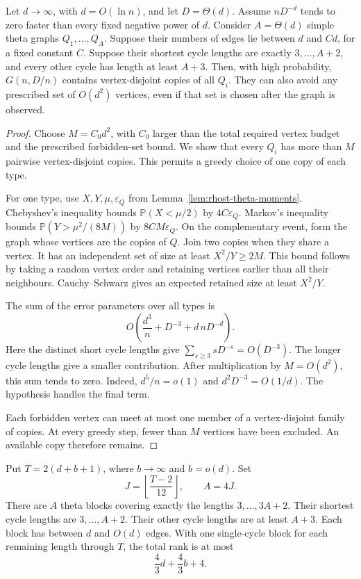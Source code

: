 \begin{lemma}
\label{lem:rhost-theta-list}
Let $d\to\infty$, with $d=O(\ln n)$, and let $D=\Theta(d)$.
Assume $nD^{-d}$ tends to zero faster than every fixed negative power of $d$.
Consider $A=\Theta(d)$ simple theta graphs $Q_1,\ldots,Q_A$.
Suppose their numbers of edges lie between $d$ and $Cd$, for a fixed constant $C$.
Suppose their shortest cycle lengths are exactly $3,\ldots,A+2$,
and every other cycle has length at least $A+3$.
Then, with high probability, $G(n,D/n)$ contains vertex-disjoint copies of all $Q_i$.
They can also avoid any prescribed set of $O(d^2)$ vertices, even if that set is chosen after the graph is observed.
\end{lemma}

\begin{proof}
Choose $M=C_0d^2$, with $C_0$ larger than the total required vertex budget and the prescribed forbidden-set bound.
We show that every $Q_i$ has more than $M$ pairwise vertex-disjoint copies.
This permits a greedy choice of one copy of each type.

For one type, use $X,Y,\mu,\varepsilon_Q$ from Lemma~\ref{lem:rhost-theta-moments}.
Chebyshev's inequality bounds $\mathbb P(X<\mu/2)$ by $4C\varepsilon_Q$.
Markov's inequality bounds $\mathbb P(Y>\mu^2/(8M))$ by $8CM\varepsilon_Q$.
On the complementary event, form the graph whose vertices are the copies of $Q$.
Join two copies when they share a vertex.
It has an independent set of size at least $X^2/Y\ge2M$.
This bound follows by taking a random vertex order and retaining vertices earlier than all their neighbours.
Cauchy--Schwarz gives an expected retained size at least $X^2/Y$.

The sum of the error parameters over all types is
\[
 O\!\left(\frac{d^3}{n}+D^{-3}+d\,nD^{-d}\right).
\]
Here the distinct short cycle lengths give
$\sum_{s\ge3}sD^{-s}=O(D^{-3})$.
The longer cycle lengths give a smaller contribution.
After multiplication by $M=O(d^2)$, this sum tends to zero.
Indeed, $d^5/n=o(1)$ and $d^2D^{-3}=O(1/d)$.
The hypothesis handles the final term.

Each forbidden vertex can meet at most one member of a vertex-disjoint family of copies.
At every greedy step, fewer than $M$ vertices have been excluded.
An available copy therefore remains.
\end{proof}

\begin{lemma}
\label{lem:rhost-whole-theta-interval}
Put $T=2(d+b+1)$, where $b\to\infty$ and $b=o(d)$.
Set
\[
 J=\left\lfloor\frac{T-2}{12}\right\rfloor,\qquad A=4J.
\]
There are $A$ theta blocks covering exactly the lengths $3,\ldots,3A+2$.
Their shortest cycle lengths are $3,\ldots,A+2$.
Their other cycle lengths are at least $A+3$.
Each block has between $d$ and $O(d)$ edges.
With one single-cycle block for each remaining length through $T$,
the total rank is at most
\[
 \frac43d+\frac43b+4.
\]
\end{lemma}

